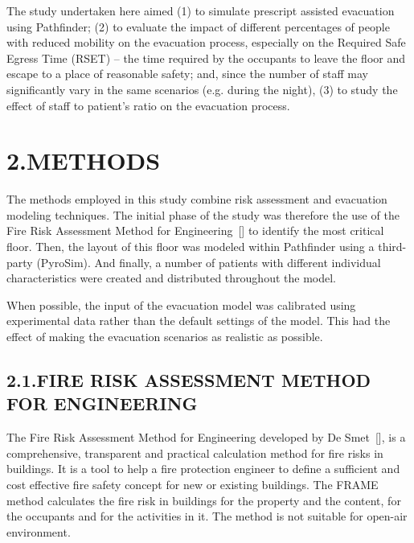 \documentclass{style/llncs}
\begin{document}
The study undertaken here aimed (1) to simulate prescript assisted
evacuation using Pathfinder; (2) to evaluate the impact of different
percentages of people with reduced mobility on the evacuation process,
especially on the Required Safe Egress Time (RSET) – the time required by
the occupants to leave the floor and escape to a place of reasonable
safety; and, since the number of staff may significantly vary in the same
scenarios (e.g. during the night), (3) to study the effect of staff to
patient's ratio on the evacuation process.%

\section{2.\hspace*{0.5em}METHODS}\label{sec-methods}%

\noindent{}The methods employed in this study combine risk assessment
and evacuation modeling techniques. The initial phase of the study was
therefore the use of the Fire Risk Assessment Method for Engineering~[]
to identify the most critical floor. Then, the layout of this floor was modeled
within Pathfinder using a third-party (PyroSim). And finally, a number of
patients with different individual characteristics were created and
distributed throughout the model.%

When possible, the input of the evacuation model was calibrated using
experimental data rather than the default settings of the model. This had
the effect of making the evacuation scenarios as realistic as possible.%

\subsection{2.1.\hspace*{0.5em}FIRE RISK ASSESSMENT METHOD FOR ENGINEERING}\label{sec-fire-risk-assessment-method-for-engineering}%

\noindent{}The Fire Risk Assessment Method for Engineering developed by De
Smet~[], is a comprehensive, transparent and practical calculation
method for fire risks in buildings. It is a tool to help a fire
protection engineer to define a sufficient and cost effective fire safety
concept for new or existing buildings. The FRAME method calculates the
fire risk in buildings for the property and the content, for the
occupants and for the activities in it. The method is not suitable for
open-air environment.%
\end{document}
